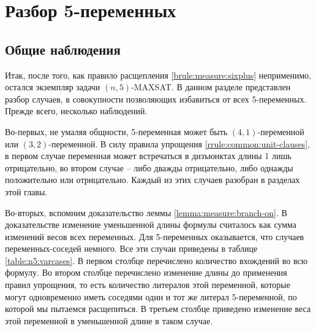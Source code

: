 
\section{Разбор 5-переменных}
\label{sec:n5}

\subsection{Общие наблюдения}
\label{subsec:n5:observations}

\firstpar{}Итак, после того, как правило расщепления \ref{brule:measure:sixplus} неприменимо, остался экземпляр задачи $(n,5)$-MAXSAT. В данном разделе представлен разбор случаев, в совокупности позволяющих избавиться от всех 5-переменных. Прежде всего, несколько наблюдений.

Во-первых, не умаляя общности, 5-переменная может быть $(4,1)$-переменной или $(3,2)$-переменной. В силу правила упрощения \ref{rrule:common:unit-clauses}, в первом случае переменная может встречаться в дизъюнктах длины 1 лишь отрицательно, во втором случае -- либо дважды отрицательно, либо однажды положительно или отрицательно. Каждый из этих случаев разобран в разделах этой главы.

Во-вторых, вспомним доказательство леммы \ref{lemma:measure:branch-on}. В доказательстве изменение уменьшенной длины формулы считалось как сумма изменений весов всех переменных. Для 5-переменных оказывается, что случаев переменных-соседей немного. Все эти случаи приведены в таблице \ref{table:n5:varcases}. В первом столбце перечислено количество вхождений во всю формулу. Во втором столбце перечислено изменение длины до применения правил упрощения, то есть количество литералов этой переменной, которые могут одновременно иметь соседями один и тот же литерал 5-переменной, по которой мы пытаемся расщепиться. В третьем столбце приведено изменение веса этой переменной в уменьшенной длине в таком случае.


